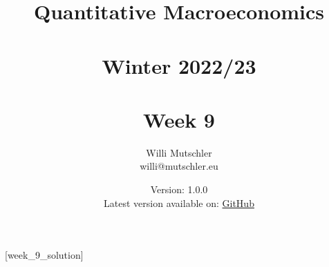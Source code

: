 
\newif\ifDisplaySolutions%


\title{Quantitative Macroeconomics\\~\\Winter 2022/23\\~\\Week 9}
\author{Willi Mutschler\\willi@mutschler.eu}
\date{Version: 1.0.0\\Latest version available on: \href{https://github.com/wmutschl/Quantitative-Macroeconomics/releases/latest/download/week_9.pdf}{GitHub}}
\maketitle\thispagestyle{empty}

\newpage
{}[week_9_solution]
\tableofcontents\thispagestyle{empty}\newpage

\setcounter{page}{1}
\newpage
\newpage
\newpage

\printbibliography
\newpage

\ifDisplaySolutions
\newpage
\appendix
\section{Solutions}

\fi
